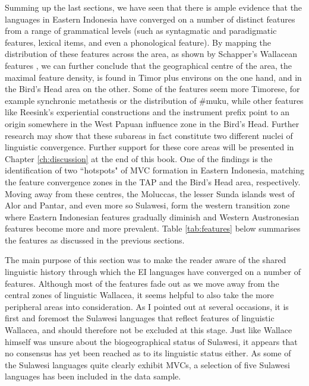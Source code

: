 Summing up the last sections, we have seen that there is ample evidence that the languages in Eastern Indonesia have converged on a number of distinct features from a range of grammatical levels (such as syntagmatic and paradigmatic features, lexical items, and even a phonological feature). By mapping the distribution of these features across the area, as shown by Schapper's Wallacean features \citep[138f.]{schapper2015wallacea}, we can further conclude that the geographical centre of the area, the maximal feature density, is found in Timor plus environs on the one hand, and in the Bird's Head area on the other. Some of the features seem more Timorese, for example synchronic metathesis or the distribution of \#muku, while other features like Reesink's experiential constructions and the instrument prefix point to an origin somewhere in the West Papuan influence zone in the Bird's Head. Further research may show that these subareas in fact constitute two different nuclei of linguistic convergence. Further support for these core areas will be presented in Chapter \ref{ch:discussion} at the end of this book. One of the findings is the identification of two ``hotspots" of MVC formation in Eastern Indonesia, matching the feature convergence zones in the TAP and the Bird's Head area, respectively. Moving away from these centres, the Moluccas, the lesser Sunda islands west of Alor and Pantar, and even more so Sulawesi, form the western transition zone where Eastern Indonesian features gradually diminish and Western Austronesian features become more and more prevalent. Table \ref{tab:features} below summarises the features as discussed in the previous sections.

The main purpose of this section was to make the reader aware of the shared linguistic history through which the EI languages have converged on a number of features. Although most of the features fade out as we move away from the central zones of linguistic Wallacea, it seems helpful to also take the more peripheral areas into consideration. As I pointed out at several occasions, it is first and foremost the Sulawesi languages that reflect features of linguistic Wallacea, and should therefore not be excluded at this stage. Just like Wallace himself was unsure about the biogeographical status of Sulawesi, it appears that no consensus has yet been reached as to its linguistic status either. As some of the Sulawesi languages quite clearly exhibit MVCs, a selection of five Sulawesi languages has been included in the data sample. 

